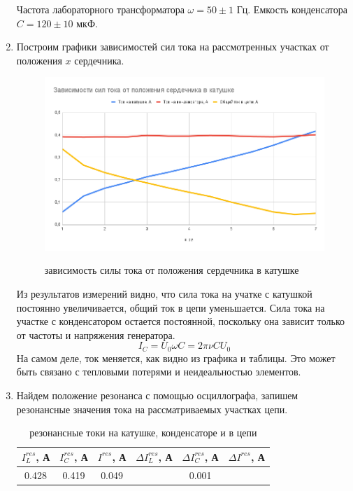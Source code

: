 \documentclass[a4paper, 12pt]{article}
\begin{document}
\begin{enumerate}
    Частота лабораторного трансформатора $\omega = 50\pm 1$ Гц.
    Емкость конденсатора $C = 120\pm 10$ мкФ.
    \newpage
    \item Построим графики зависимостей сил тока на рассмотренных участках от положения $x$ сердечника.
    \begin{figure}[htbp]
        \centering
        \includegraphics[width=0.7\linewidth]{I_x.png}
        \label{зависимость сил тока для разных расстояний}
        \caption{зависимость силы тока от положения сердечника в катушке}
    \end{figure}\newline
    Из результатов измерений видно, что сила тока на учатке с катушкой постоянно увеличивается, общий ток в цепи уменьшается. Сила тока 
    на участке с конденсатором остается постоянной, поскольку она зависит только от частоты и напряжения генератора.
    \begin{equation}
        I_{C} = U_{0} \omega C = 2\pi \nu C U_{0}
        \label{ток на участке с конденсатором}
    \end{equation}
    На самом деле, ток меняется, как видно из графика и таблицы. Это может быть связано с тепловыми потерями и неидеальностью элементов.
    \item Найдем положение резонанса с помощью осциллографа, запишем резонансные значения тока на рассматриваемых участках цепи.
    \begin{table}[htbp]
        \centering
        \begin{tabular}{|c|c|c|c|c|c|}
            \hline
            $I^{res}_{L}$, А & $I^{res}_{C}$, А & $I^{res}$, А & $\Delta I^{res}_{L}$, А & $\Delta I^{res}_{C}$, А & $\Delta I^{res}$, А\\
            \hline
            0.428 & 0.419 & 0.049 & \multicolumn{3}{|c|}{0.001}\\
            \hline
        \end{tabular}
        \caption{резонансные токи на катушке, конденсаторе и в цепи}

\end{table}
\end{enumerate}
\end{document}
